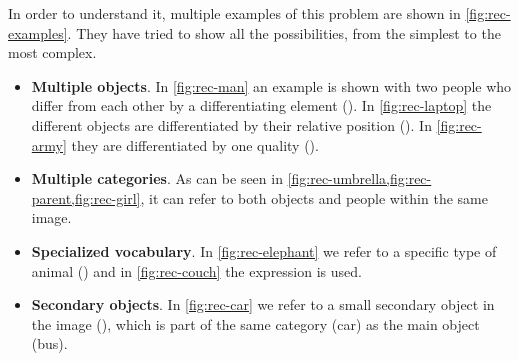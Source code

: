 In order to understand it, multiple examples of this problem are shown in
\vref{fig:rec-examples}. They have tried to show all the possibilities, from
the simplest to the most complex.
\begin{itemize}
  \item \textbf{Multiple objects}. In \vref{fig:rec-man} an example is shown
  with two people who differ from each other by a differentiating element
  (). In \vref{fig:rec-laptop} the different objects are differentiated
  by their relative position (). In \vref{fig:rec-army} they are
  differentiated by one quality ().
  \item \textbf{Multiple categories}. As can be seen in
  \vref{fig:rec-umbrella,fig:rec-parent,fig:rec-girl}, it can refer to both
  objects and people within the same image.
  \item \textbf{Specialized vocabulary}. In \vref{fig:rec-elephant} we refer to
  a specific type of animal () and in \vref{fig:rec-couch} the
  expression  is used.
  \item \textbf{Secondary objects}. In \vref{fig:rec-car} we refer to a small
  secondary object in the image (), which is part of the same category
  (car) as the main object (bus).
\end{itemize}

